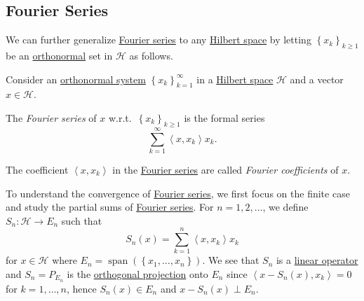 \subsection{Fourier Series}
We can further generalize \hyperref[def:Fourier-series]{Fourier series} to any \hyperref[def:Hilbert-space]{Hilbert space} by letting \(\left\{ x_{k} \right\}_{k\geq 1} \) be an \hyperref[def:orthonormal-system]{orthonormal} set in \(\mathcal{H} \) as follows.

\begin{definition*}
	Consider an \hyperref[def:orthonormal-system]{orthonormal system} \(\left\{ x_k \right\} _{k=1}^{\infty} \) in a \hyperref[def:Hilbert-space]{Hilbert space} \(\mathcal{H} \) and a vector \(x\in \mathcal{H} \).
	\begin{definition}\label{def:Fourier-series}
		The \emph{Fourier series} of \(x\) w.r.t.\ \(\left\{ x_k \right\}_{k\geq 1} \) is the formal series
		\[
			\sum_{k=1} ^{\infty} \left\langle x, x_k \right\rangle x_k.
		\]
	\end{definition}
	\begin{definition}\label{def:Fourier-coefficient}
		The coefficient \(\left\langle x, x_k \right\rangle \) in the \hyperref[def:Fourier-series]{Fourier series} are called \emph{Fourier coefficients} of \(x\).
	\end{definition}
\end{definition*}

To understand the convergence of \hyperref[def:Fourier-series]{Fourier series}, we first focus on the finite case and study the partial sums of \hyperref[def:Fourier-series]{Fourier series}. For \(n = 1, 2, \dots  \), we define \(S_{n} \colon \mathcal{H} \to E_{n} \) such that
\[
	S_n (x)= \sum_{k=1}^{n} \left\langle x, x_{k}  \right\rangle x_{k}
\]
for \(x\in \mathcal{H} \) where \(E_{n} = \mathop{\mathrm{span}}(\left\{ x_1, \dots , x_{n}\right\})\). We see that \(S_n\) is a \hyperref[def:linear-map]{linear operator} and \(S_n= P_{E_n}\) is the \hyperref[def:orthogonal-projection]{orthogonal projection} onto \(E_n\) since \(\left\langle x -S_n(x), x_k \right\rangle = 0\) for \(k = 1, \dots  , n\), hence \(S_{n} (x)\in E_{n}\) and \(x-S_n(x)\perp E_n\).

